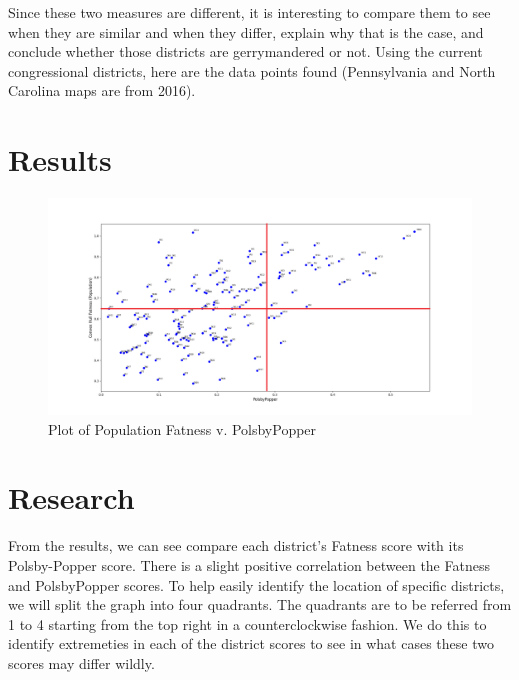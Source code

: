 \documentclass[letterpaper]{article}
\begin{document}

Since these two measures are different, it is interesting to compare them to see when they are similar and when they differ, explain why that is the case, and conclude whether those districts are gerrymandered or not. Using the current congressional districts, here are the data points found (Pennsylvania and North Carolina maps are from 2016).

\section{Results}

\begin{figure}[H]
	\includegraphics[width=\linewidth]{./figures/convexHullPopulationFatnessVPP2Edited.png}
	\caption{Plot of Population Fatness v. PolsbyPopper}
	\label{fig:datapoints}
\end{figure}

\section{Research}
From the results, we can see compare each district's Fatness score with its Polsby-Popper score. There is a slight positive correlation between the Fatness and PolsbyPopper scores.
To help easily identify the location of specific districts, we will split the graph into four quadrants. The quadrants are to be referred from 1 to 4 starting from the top right in a counterclockwise fashion. We do this to identify extremeties in each of the district scores to see in what cases these two scores may differ wildly.
\end{document}
